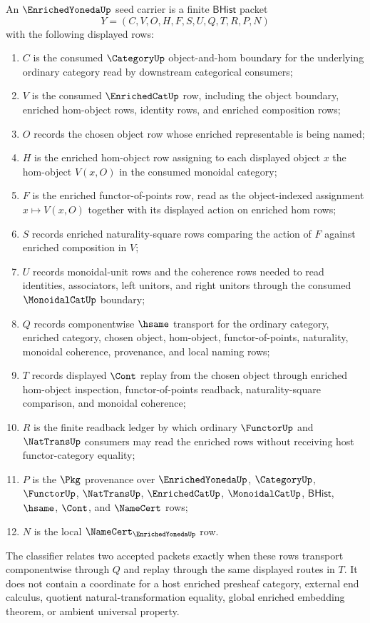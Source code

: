 \begin{definition}
\label{def:enriched-yoneda-seed-carrier}
An $\EnrichedYonedaUp$ seed carrier is a finite $\mathsf{BHist}$ packet
$$
Y=(C,V,O,H,F,S,U,Q,T,R,P,N)
$$
with the following displayed rows:
\begin{enumerate}
\item $C$ is the consumed $\CategoryUp$ object-and-hom boundary for the
  underlying ordinary category read by downstream categorical consumers;
\item $V$ is the consumed $\EnrichedCatUp$ row, including the object boundary,
  enriched hom-object rows, identity rows, and enriched composition rows;
\item $O$ records the chosen object row whose enriched representable is being
  named;
\item $H$ is the enriched hom-object row assigning to each displayed object
  $x$ the hom-object $V(x,O)$ in the consumed monoidal category;
\item $F$ is the enriched functor-of-points row, read as the object-indexed
  assignment $x \mapsto V(x,O)$ together with its displayed action on enriched
  hom rows;
\item $S$ records enriched naturality-square rows comparing the action of $F$
  against enriched composition in $V$;
\item $U$ records monoidal-unit rows and the coherence rows needed to read
  identities, associators, left unitors, and right unitors through the consumed
  $\MonoidalCatUp$ boundary;
\item $Q$ records componentwise $\hsame$ transport for the ordinary category,
  enriched category, chosen object, hom-object, functor-of-points, naturality,
  monoidal coherence, provenance, and local naming rows;
\item $T$ records displayed $\Cont$ replay from the chosen object through
  enriched hom-object inspection, functor-of-points readback, naturality-square
  comparison, and monoidal coherence;
\item $R$ is the finite readback ledger by which ordinary $\FunctorUp$ and
  $\NatTransUp$ consumers may read the enriched rows without receiving host
  functor-category equality;
\item $P$ is the $\Pkg$ provenance over $\EnrichedYonedaUp$, $\CategoryUp$,
  $\FunctorUp$, $\NatTransUp$, $\EnrichedCatUp$, $\MonoidalCatUp$,
  $\mathsf{BHist}$, $\hsame$, $\Cont$, and $\NameCert$ rows;
\item $N$ is the local $\NameCert_{\EnrichedYonedaUp}$ row.
\end{enumerate}
The classifier relates two accepted packets exactly when these rows transport
componentwise through $Q$ and replay through the same displayed routes in $T$.
It does not contain a coordinate for a host enriched presheaf category, external
end calculus, quotient natural-transformation equality, global enriched
embedding theorem, or ambient universal property.
\end{definition}


